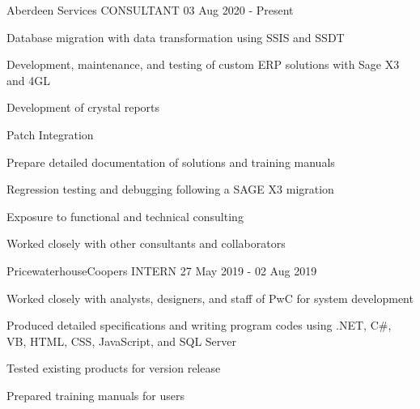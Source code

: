 

\begin{cventries}

  \cventry
    {Aberdeen Services} %
    {CONSULTANT} %
    {} %
    {03 Aug 2020 - Present} %
    {
      \begin{cvitems} %
        \item{Database migration with data transformation using SSIS and SSDT}
        \item {Development, maintenance, and testing of custom ERP solutions with Sage X3 and 4GL}
        \item {Development of crystal reports}
        \item {Patch Integration}
        \item {Prepare detailed documentation of solutions and training manuals}
        \item {Regression testing and debugging following a SAGE X3 migration}
        \item {Exposure to functional and technical consulting}
        \item {Worked closely with other consultants and collaborators}
      \end{cvitems}
    }

  \cventry
    {PricewaterhouseCoopers} %
    {INTERN} %
    {} %
    {27 May 2019 - 02 Aug 2019} %
    {
      \begin{cvitems} %
        \item{Worked closely with analysts, designers, and staff of PwC for system development}
        \item {Produced detailed specifications and writing program codes using .NET, C#, VB, HTML, CSS, JavaScript, and SQL Server}
        \item {Tested existing products for version release}
        \item {Prepared training manuals for users}
      \end{cvitems}
    }

\end{cventries}
